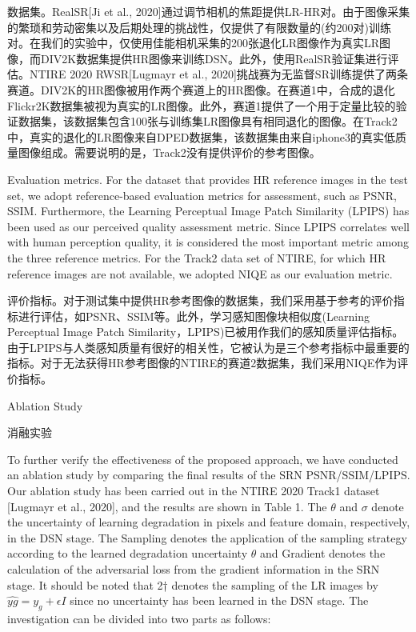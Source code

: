 数据集。RealSR[Ji et al., 2020]通过调节相机的焦距提供LR-HR对。由于图像采集的繁琐和劳动密集以及后期处理的挑战性，仅提供了有限数量的(约200对)训练对。在我们的实验中，仅使用佳能相机采集的200张退化LR图像作为真实LR图像，而DIV2K数据集提供HR图像来训练DSN。此外，使用RealSR验证集进行评估。NTIRE 2020 RWSR[Lugmayr et al., 2020]挑战赛为无监督SR训练提供了两条赛道。DIV2K的HR图像被用作两个赛道上的HR图像。在赛道1中，合成的退化Flickr2K数据集被视为真实的LR图像。此外，赛道1提供了一个用于定量比较的验证数据集，该数据集包含100张与训练集LR图像具有相同退化的图像。在Track2中，真实的退化的LR图像来自DPED数据集，该数据集由来自iphone3的真实低质量图像组成。需要说明的是，Track2没有提供评价的参考图像。

Evaluation metrics. For the dataset that provides HR reference images in the test set, we adopt reference-based evaluation metrics for assessment, such as PSNR, SSIM. Furthermore, the Learning Perceptual Image Patch Similarity (LPIPS) has been used as our perceived quality assessment metric. Since LPIPS correlates well with human perception quality, it is considered the most important metric among the three reference metrics. For the Track2 data set of NTIRE, for which HR reference images are not available, we adopted NIQE as our evaluation metric.

评价指标。对于测试集中提供HR参考图像的数据集，我们采用基于参考的评价指标进行评估，如PSNR、SSIM等。此外，学习感知图像块相似度(Learning Perceptual Image Patch Similarity，LPIPS)已被用作我们的感知质量评估指标。由于LPIPS与人类感知质量有很好的相关性，它被认为是三个参考指标中最重要的指标。对于无法获得HR参考图像的NTIRE的赛道2数据集，我们采用NIQE作为评价指标。

Ablation Study

消融实验

To further verify the effectiveness of the proposed approach, we have conducted an ablation study by comparing the final results of the SRN PSNR/SSIM/LPIPS. Our ablation study has been carried out in the NTIRE 2020 Track1 dataset [Lugmayr et al., 2020], and the results are shown in Table 1. The $\theta$ and $\sigma$ denote the uncertainty of learning degradation in pixels and feature domain, respectively, in the DSN stage. The Sampling denotes the application of the sampling strategy according to the learned degradation uncertainty $\theta$ and Gradient denotes the calculation of the adversarial loss from the gradient information in the SRN stage. It should be noted that 2† denotes the sampling of the LR images by $\hat{yg} = y_g + \epsilon I$ since no uncertainty has been learned in the DSN stage. The investigation can be divided into two parts as follows:

